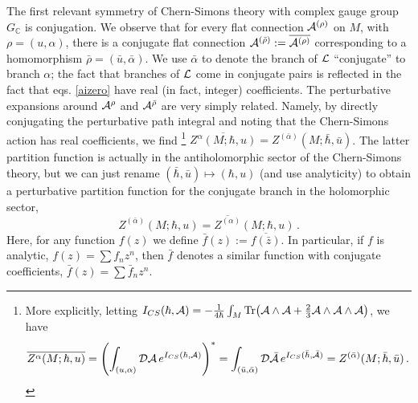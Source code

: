 \documentclass[hyper]{JHEP3}
\def\Tr{{\rm Tr}}
\def\CA {{\cal A}}
\def\CD {{\cal D}}
\def\CL {{\cal L}}
\newcommand{\C}{{\mathbb{C}}}
\newcommand\be{\begin{equation}}
\newcommand\ee{\end{equation}}
\begin{document}
The first relevant symmetry of Chern-Simons theory with complex gauge group $G_\C$ is conjugation. We observe that for every flat connection $\CA^{(\rho)}$ on $M$, with $\rho=(u,\alpha)$, there is a conjugate flat connection $\CA^{(\bar{\rho})}:= \overline{\CA^{(\rho)}}$ corresponding to a homomorphism $\bar{\rho}=(\bar{u},\bar{\alpha})$. We use $\bar{\alpha}$ to denote the branch of $\CL$ ``conjugate'' to branch $\alpha$; the fact that branches of $\CL$ come in conjugate pairs is reflected in the fact that eqs. \eqref{aizero} have real (in fact, integer) coefficients. The perturbative expansions around $\CA^{\rho}$ and $\CA^{\bar{\rho}}$ are very simply related. Namely, by directly conjugating the perturbative path integral and noting that the Chern-Simons action has real coefficients, we find%
%
\footnote{More explicitly, letting $I_{CS}(\hbar,\CA) = -\frac{1}{4\hbar}\int_M \Tr\big(\CA\wedge\CA+\frac{2}{3}\CA\wedge\CA\wedge\CA\big)$, we have
\be \overline{Z^{\alpha}(M;\hbar,u)} 
= \left(\int_{(u,\alpha)}\CD\CA\,e^{I_{CS}(\hbar,\CA)}\right)^* 
= \int_{(\bar{u},\bar{\alpha})} \CD\bar{\CA}\,e^{I_{CS}(\bar{\hbar},\bar{\CA})}
= Z^{(\bar{\alpha})}(M;\bar{\hbar},\bar{u})\,.\notag\ee} %
%
$\overline{Z^{\alpha}(M;\hbar,u)}=Z^{(\bar{\alpha})}(M;\bar{\hbar},\bar{u})$. The latter partition function is actually in the antiholomorphic sector of the Chern-Simons theory, but we can just rename $(\bar{\hbar},\bar{u})\mapsto (\hbar,u)$ (and use analyticity) to obtain a perturbative partition function for the conjugate branch in the holomorphic sector,
%
\be Z^{(\bar{\alpha})}(M;\hbar,u) = \overline{Z^{(\alpha)}}(M;\hbar,u)\,. \label{C-sym} \ee
%
Here, for any function $f(z)$ we define $\bar{f}(z):=\overline{f(\bar{z})}$. In particular, if $f$ is analytic, $f(z)=\sum f_n z^n$, then $\bar{f}$ denotes a similar function with conjugate coefficients, $\bar{f}(z)=\sum \bar{f}_n z^n$.

\end{document}
